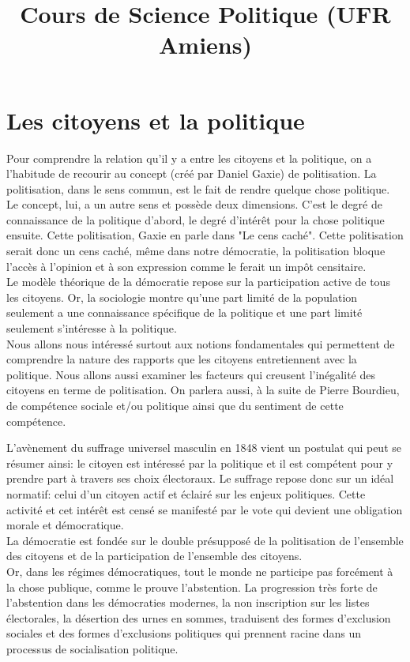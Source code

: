 \documentclass[12pt, a4paper, openany]{book}
\date{}
\title{Cours de Science Politique (UFR Amiens)}
\begin{document}
\chapter{Les citoyens et la politique}

Pour comprendre la relation qu'il y a entre les citoyens et la politique, on a l'habitude de recourir au concept (créé par Daniel Gaxie) de politisation. La politisation, dans le sens commun, est le fait de rendre quelque chose politique. \\
Le concept, lui, a un autre sens et possède deux dimensions. C'est le degré de connaissance de la politique d'abord, le degré d'intérêt pour la chose politique ensuite. Cette politisation, Gaxie en parle dans "Le cens caché". Cette politisation serait donc un cens caché, même dans notre démocratie, la politisation bloque l'accès à l'opinion et à son expression comme le ferait un impôt censitaire. \\
Le modèle théorique de la démocratie repose sur la participation active de tous les citoyens. Or, la sociologie montre qu'une part limité de la population seulement a une connaissance spécifique de la politique et une part limité seulement s'intéresse à la politique. \\
Nous allons nous intéressé surtout aux notions fondamentales qui permettent de comprendre la nature des rapports que les citoyens entretiennent avec la politique. Nous allons aussi examiner les facteurs qui creusent l'inégalité des citoyens en terme de politisation. On parlera aussi, à la suite de Pierre Bourdieu, de compétence sociale et/ou politique ainsi que du sentiment de cette compétence. 


L'avènement du suffrage universel masculin en 1848 vient un postulat qui peut se résumer ainsi: le citoyen est intéressé par la politique et il est compétent pour y prendre part à travers ses choix électoraux. Le suffrage repose donc sur un idéal normatif: celui d'un citoyen actif et éclairé sur les enjeux politiques. Cette activité et cet intérêt est censé se manifesté par le vote qui devient une obligation morale et démocratique. \\
La démocratie est fondée sur le double présupposé de la politisation de l'ensemble des citoyens et de la participation de l'ensemble des citoyens. \\
Or, dans les régimes démocratiques, tout le monde ne participe pas forcément à la chose publique, comme le prouve l'abstention. La progression très forte de l'abstention dans les démocraties modernes, la non inscription sur les listes électorales, la désertion des urnes en sommes, traduisent des formes d'exclusion sociales et des formes d'exclusions politiques qui prennent racine dans un processus de socialisation politique.
\end{document}
